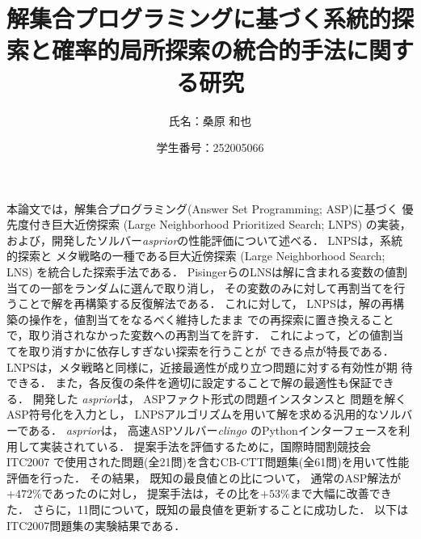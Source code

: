 \documentclass[dvipdfmx,a4paper]{jsarticle}
\title{\vspace{-3cm}解集合プログラミングに基づく系統的探索と確率的局所探索の統合的手法に関する研究}
\author{氏名：桑原 和也}
\date{学生番号：252005066}
\begin{document}
\maketitle

本論文では，解集合プログラミング(Answer Set Programming; ASP)に基づく
優先度付き巨大近傍探索 (Large Neighborhood Prioritized Search; LNPS)
の実装，および，開発したソルバー\textit{asprior}の性能評価について述べる．
%
LNPSは，系統的探索と
メタ戦略の一種である巨大近傍探索
(Large Neighborhood Search; LNS)
を統合した探索手法である．
%
PisingerらのLNSは解に含まれる変数の値割当ての一部をランダムに選んで取り消し，
その変数のみに対して再割当てを行うことで解を再構築する反復解法である．
これに対して，
LNPSは，解の再構築の操作を，値割当てをなるべく維持したまま
での再探索に置き換えることで，取り消されなかった変数への再割当てを許す．
これによって，どの値割当てを取り消すかに依存しすぎない探索を行うことが
できる点が特長である．
LNPSは，メタ戦略と同様に，近接最適性が成り立つ問題に対する有効性が期
待できる．
また，各反復の条件を適切に設定することで解の最適性も保証できる．
開発した \textit{asprior}は，
ASPファクト形式の問題インスタンスと
問題を解くASP符号化を入力とし，
LNPSアルゴリズムを用いて解を求める汎用的なソルバーである．
\textit{asprior}は，
高速ASPソルバー\textit{clingo}
のPythonインターフェースを利用して実装されている．
%
提案手法を評価するために，国際時間割競技会ITC2007
で使用された問題(全21問)を含むCB-CTT問題集(全61問)を用いて性能評価を行った．
その結果，
既知の最良値との比について，
通常のASP解法が$+472\%$であったのに対し，
提案手法は，その比を$+53\%$まで大幅に改善できた．
さらに，11問について，既知の最良値を更新することに成功した．
以下はITC2007問題集の実験結果である．
\end{document}
